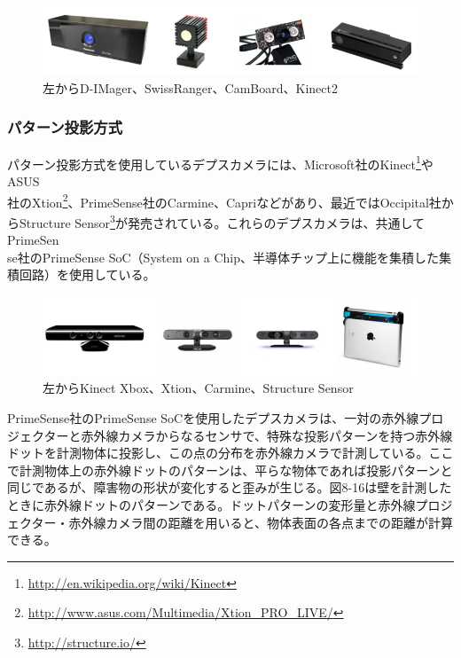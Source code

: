 \begin{figure}[htp]
  \centering
  \includegraphics[width=12cm]{pictures/chapter8/pic_08_13.png}
  \caption{左からD-IMager、SwissRanger、CamBoard、Kinect2}
\end{figure}

\subsubsection{パターン投影方式}

パターン投影方式を使用しているデプスカメラには、Microsoft社のKinect\footnote{\url{http://en.wikipedia.org/wiki/Kinect}}やASUS\\社のXtion\footnote{\url{http://www.asus.com/Multimedia/Xtion\_PRO\_LIVE/}}、PrimeSense社のCarmine、Capriなどがあり、最近ではOccipital社からStructure Sensor\footnote{\url{http://structure.io/}}が発売されている。これらのデプスカメラは、共通してPrimeSen\\se社のPrimeSense SoC（System on a Chip、半導体チップ上に機能を集積した集積回路）を使用している。

\begin{figure}[htp]
  \centering
  \includegraphics[width=\columnwidth]{pictures/chapter8/pic_08_14.png}
  \caption{左からKinect Xbox、Xtion、Carmine、Structure Sensor}
\end{figure}

PrimeSense社のPrimeSense SoCを使用したデプスカメラは、一対の赤外線プロジェクターと赤外線カメラからなるセンサで、特殊な投影パターンを持つ赤外線ドットを計測物体に投影し、この点の分布を赤外線カメラで計測している。ここで計測物体上の赤外線ドットのパターンは、平らな物体であれば投影パターンと同じであるが、障害物の形状が変化すると歪みが生じる。図8-16は壁を計測したときに赤外線ドットのパターンである。ドットパターンの変形量と赤外線プロジェクター・赤外線カメラ間の距離を用いると、物体表面の各点までの距離が計算できる。

